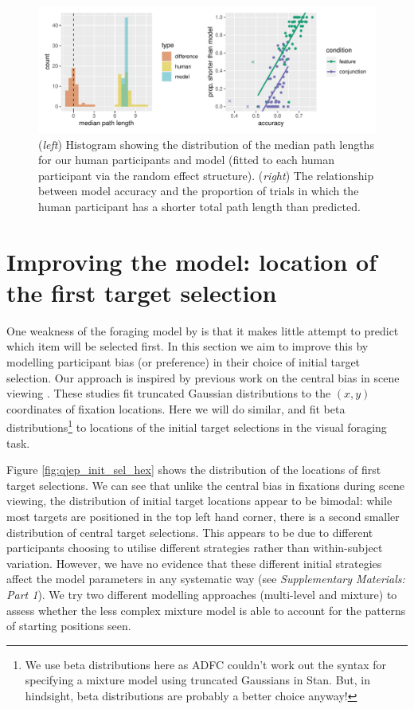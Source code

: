 \documentclass[preprints, article,submit,pdftex,moreauthors]{Definitions/mdpi}
\begin{document}
\begin{figure}[H]
\centering
\includegraphics[width=12 cm]{Figures/path_length.pdf}
\caption{(\textit{left}) Histogram showing the distribution of the median path lengths for our human participants and model (fitted to each human participant via the random effect structure). (\textit{right}) The relationship between model accuracy and the proportion of trials in which the human participant has a shorter total path length than predicted.}
\label{fig:qjep_path_lengths}
\end{figure} 

\section{Improving the model: location of the first target selection}

One weakness of the foraging model by \cite{clarke2022foraging} is that it makes little attempt to predict which item will be selected first. In this section we aim to improve this by modelling participant bias (or preference) in their choice of initial target selection. Our approach is inspired by previous work on the central bias in scene viewing \cite{clarke_tatler2014, clarke2017}. These studies fit truncated Gaussian distributions to the  $(x,y)$ coordinates of fixation locations. Here we will do similar, and fit beta distributions\footnote{We use beta distributions here as ADFC couldn't work out the syntax for specifying a mixture model using truncated Gaussians in Stan. But, in hindsight, beta distributions are probably a better choice anyway!} to locations of the initial target selections in the visual foraging task. 

Figure \ref{fig:qjep_init_sel_hex} shows the distribution of the locations of first target selections. We can see that unlike the central bias in fixations during scene viewing, the distribution of initial target locations appear to be bimodal: while most targets are positioned in the top left hand corner, there is a second smaller distribution of central target selections. This appears to be due to different participants choosing to utilise different strategies rather than within-subject variation. However, we have no evidence that these different initial strategies affect the model parameters in any systematic way (see \textit{Supplementary Materials: Part 1}). We try two different modelling approaches (multi-level and mixture) to assess whether the less complex mixture model is able to account for the patterns of starting positions seen.
\end{document}

